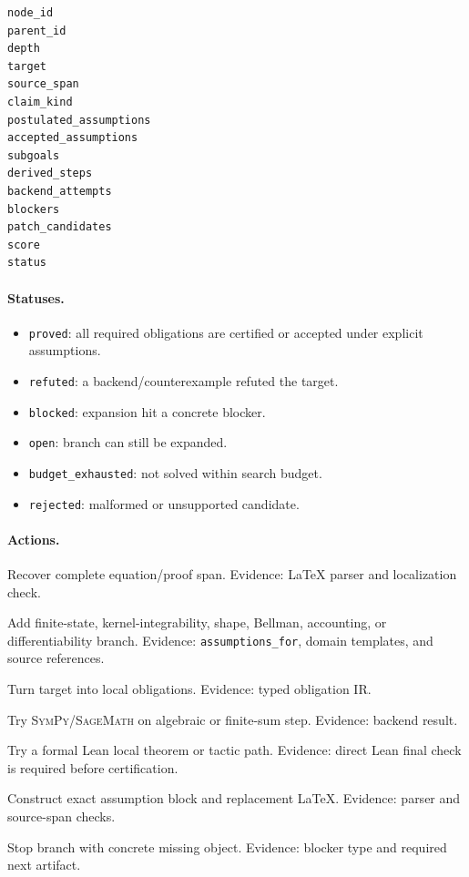 \documentclass[11pt]{article}
\newcommand{\Sage}{\textsc{SageMath}}
\newcommand{\SymPy}{\textsc{SymPy}}
\begin{document}
\begin{verbatim}
node_id
parent_id
depth
target
source_span
claim_kind
postulated_assumptions
accepted_assumptions
subgoals
derived_steps
backend_attempts
blockers
patch_candidates
score
status
\end{verbatim}

\paragraph{Statuses.}

\begin{itemize}[leftmargin=*]
\item \texttt{proved}: all required obligations are certified or accepted under
  explicit assumptions.
\item \texttt{refuted}: a backend/counterexample refuted the target.
\item \texttt{blocked}: expansion hit a concrete blocker.
\item \texttt{open}: branch can still be expanded.
\item \texttt{budget\_exhausted}: not solved within search budget.
\item \texttt{rejected}: malformed or unsupported candidate.
\end{itemize}

\paragraph{Actions.}

\begin{description}[style=nextline,leftmargin=0pt]
\item[Source-span expansion.]
Recover complete equation/proof span. Evidence: LaTeX parser and localization
check.
\item[Assumption expansion.]
Add finite-state, kernel-integrability, shape, Bellman, accounting, or
differentiability branch. Evidence: \texttt{assumptions\_for}, domain
templates, and source references.
\item[Subgoal split.]
Turn target into local obligations. Evidence: typed obligation IR.
\item[Algebra/backend check.]
Try \SymPy/\Sage{} on algebraic or finite-sum step. Evidence: backend result.
\item[Lean/Pantograph check.]
Try a formal Lean local theorem or tactic path. Evidence: direct Lean final
check is required before certification.
\item[Patch synthesis.]
Construct exact assumption block and replacement LaTeX. Evidence: parser and
source-span checks.
\item[Blocker record.]
Stop branch with concrete missing object. Evidence: blocker type and required
next artifact.
\end{description}
\end{document}
